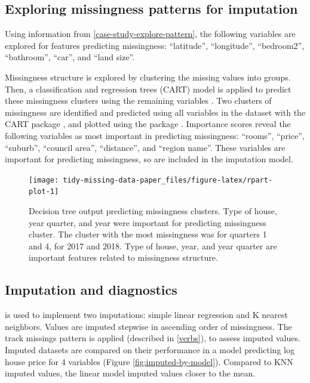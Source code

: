 \documentclass[
]{jss}
\begin{document}
\hypertarget{case-study-explore-for-imp}{%
\subsection{Exploring missingness patterns for imputation}\label{case-study-explore-for-imp}}

Using information from \ref{case-study-explore-pattern}, the following variables are explored for features predicting missingness: ``latitude'', ``longitude'', ``bedroom2'', ``bathroom'', ``car'', and ``land size''.

Missingness structure is explored by clustering the missing values into groups. Then, a classification and regression trees (CART) model is applied to predict these missingness clusters using the remaining variables \citep{Tierney2015, Barnett2017}. Two clusters of missingness are identified and predicted using all variables in the dataset with the CART package  \citep{rpart}, and plotted using the  package \citep{rpart-plot}. Importance scores reveal the following variables as most important in predicting missingness: ``rooms'', ``price'', ``suburb'', ``council area'', ``distance'', and ``region name''. These variables are important for predicting missingness, so are included in the imputation model.

\begin{CodeChunk}
\begin{figure}

{\centering \texttt{[image: tidy-missing-data-paper\_files/figure-latex/rpart-plot-1]} 

}

\caption[Decision tree output predicting missingness clusters]{Decision tree output predicting missingness clusters. Type of house, year quarter, and year were important for predicting missingness cluster. The cluster with the most missingness was for quarters 1 and 4, for 2017 and 2018. Type of house, year, and year quarter are important features related to missingness structure.}\label{fig:rpart-plot}
\end{figure}
\end{CodeChunk}

\hypertarget{case-study-imp-diagnosis}{%
\subsection{Imputation and diagnostics}\label{case-study-imp-diagnosis}}

 is used to implement two imputations: simple linear regression and K nearest neighbors. Values are imputed stepwise in ascending order of missingness. The track missings pattern is applied (described in \ref{verbs}), to assess imputed values. Imputed datasets are compared on their performance in a model predicting log house price for 4 variables (Figure \ref{fig:imputed-by-model}). Compared to KNN imputed values, the linear model imputed values closer to the mean.
\end{document}
